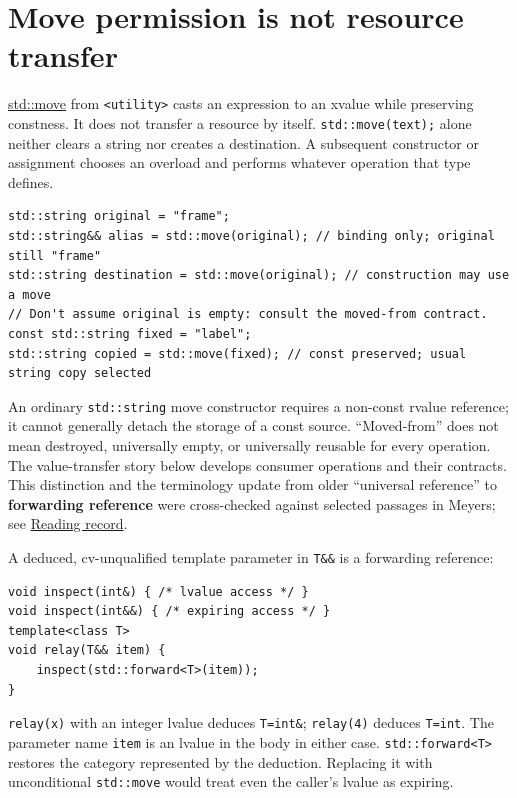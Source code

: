 \section{Move permission is not resource transfer}\label{01-foundations-i-ch003-move-permission-is-not-resource-transfer}

\hypertarget{01-foundations-i-ch003-move-permission-is-not-resource-transfer}{}

\hyperref[appendix-0104b704fb11]{std::move} from \texttt{\textless{}utility\textgreater{}} casts an expression to an xvalue while preserving constness. It does not transfer a resource by itself. \texttt{std::move(text);} alone neither clears a string nor creates a destination. A subsequent constructor or assignment chooses an overload and performs whatever operation that type defines.

\begin{verbatim}
std::string original = "frame";
std::string&& alias = std::move(original); // binding only; original still "frame"
std::string destination = std::move(original); // construction may use a move
// Don't assume original is empty: consult the moved-from contract.
const std::string fixed = "label";
std::string copied = std::move(fixed); // const preserved; usual string copy selected
\end{verbatim}

An ordinary \texttt{std::string} move constructor requires a non-const rvalue reference; it cannot generally detach the storage of a const source. ``Moved-from'' does not mean destroyed, universally empty, or universally reusable for every operation. The value-transfer story below develops consumer operations and their contracts. This distinction and the terminology update from older ``universal reference'' to \textbf{forwarding reference} were cross-checked against selected passages in Meyers; see \hyperref[appendix-a103e7846d21-m008---borrowing-categories-and-const-access]{Reading record}.

A deduced, cv-unqualified template parameter in \texttt{T\&\&} is a forwarding reference:

\begin{verbatim}
void inspect(int&) { /* lvalue access */ }
void inspect(int&&) { /* expiring access */ }
template<class T>
void relay(T&& item) {
    inspect(std::forward<T>(item));
}
\end{verbatim}

\texttt{relay(x)} with an integer lvalue deduces \texttt{T=int\&}; \texttt{relay(4)} deduces \texttt{T=int}. The parameter name \texttt{item} is an lvalue in the body in either case. \texttt{std::forward\textless{}T\textgreater{}} restores the category represented by the deduction. Replacing it with unconditional \texttt{std::move} would treat even the caller's lvalue as expiring.

